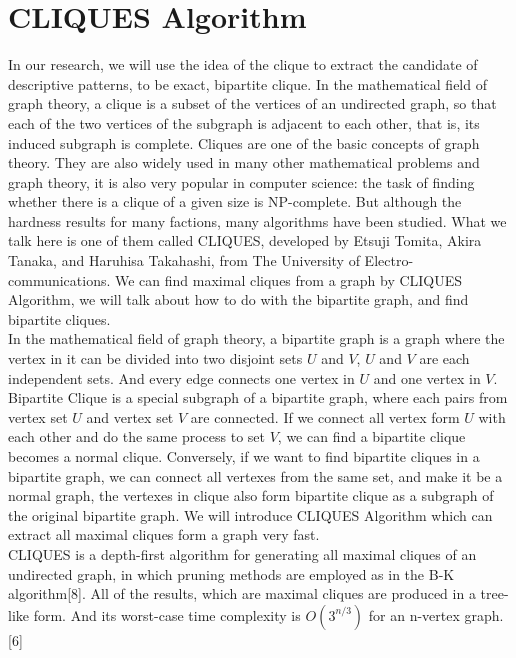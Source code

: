 \section{CLIQUES Algorithm}
In our research, we will use the idea of the clique to extract the candidate of descriptive patterns, to be exact, bipartite clique. In the mathematical field of graph theory, a clique is a subset of the vertices of an undirected graph, so that each of the two vertices of the subgraph is adjacent to each other, that is, its induced subgraph is complete. Cliques are one of the basic concepts of graph theory. They are also widely used in many other mathematical problems and graph theory, it is also very popular in computer science: the task of finding whether there is a clique of a given size is NP-complete. But although the hardness results for many factions, many algorithms have been studied. What we talk here is one of them called CLIQUES, developed by Etsuji Tomita, Akira Tanaka, and Haruhisa Takahashi, from The University of Electro-communications. We can find maximal cliques from a graph by CLIQUES Algorithm, we will talk about how to do with the bipartite graph, and find bipartite cliques.\\
In the mathematical field of graph theory, a bipartite graph is a graph where the vertex in it can be divided into two disjoint sets $U$ and $V$, $U$ and $V$ are each independent sets. And every edge connects one vertex in $U$ and one vertex in $V$. Bipartite Clique is a special subgraph of a bipartite graph, where each pairs from vertex set $U$ and vertex set $V$  are connected. If we connect all vertex form $U$ with each other and do the same process to set $V$, we can find a bipartite clique becomes a normal clique. Conversely, if we want to find bipartite cliques in a bipartite graph, we can connect all vertexes from the same set, and make it be a normal graph, the vertexes in clique also form bipartite clique as a subgraph of the original bipartite graph. We will introduce CLIQUES Algorithm which can extract all maximal cliques form a graph very fast.\\
CLIQUES is a depth-first algorithm for generating all maximal cliques of an undirected graph, in which pruning methods are employed as in the B-K algorithm[8]. All of the results, which are maximal cliques are produced in a tree-like form. And its worst-case time complexity is $O(3^{n/3})$ for an n-vertex graph.[6] \\
